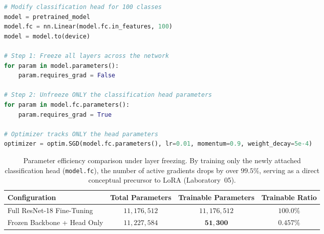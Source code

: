 \documentclass[../labs.tex]{subfiles}
\begin{document}
\begin{lstlisting}[language=Python, caption={Freezing backbone parameters and unfreezing the classification head (Cells 72--75).}, label={lst:lab01_freeze_head}]
# Modify classification head for 100 classes
model = pretrained_model
model.fc = nn.Linear(model.fc.in_features, 100)
model = model.to(device)

# Step 1: Freeze all layers across the network
for param in model.parameters():
    param.requires_grad = False

# Step 2: Unfreeze ONLY the classification head parameters
for param in model.fc.parameters():
    param.requires_grad = True

# Optimizer tracks ONLY the head parameters
optimizer = optim.SGD(model.fc.parameters(), lr=0.01, momentum=0.9, weight_decay=5e-4)
\end{lstlisting}

\begin{table}[htbp]
\centering
\small
\begin{tabularx}{\textwidth}{>{\raggedright\arraybackslash}X c c c}
\toprule
\textbf{Configuration} & \textbf{Total Parameters} & \textbf{Trainable Parameters} & \textbf{Trainable Ratio} \\
\midrule
Full ResNet-18 Fine-Tuning & $11{,}176{,}512$ & $11{,}176{,}512$ & $100.0\%$ \\
Frozen Backbone + Head Only & $11{,}227{,}584$ & $\mathbf{51{,}300}$ & $\mathbf{0.457\%}$ \\
\bottomrule
\end{tabularx}
\caption{Parameter efficiency comparison under layer freezing. By training only the newly attached classification head (\texttt{model.fc}), the number of active gradients drops by over $99.5\%$, serving as a direct conceptual precursor to LoRA (Laboratory~05).}
\label{tab:parameter_freezing}
\end{table}
\end{document}

